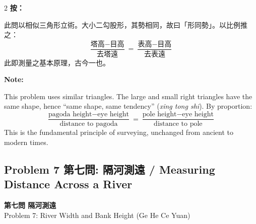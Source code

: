 \documentclass[11pt,a4paper]{article}
\newcommand{\probheader}[2]{%
  \begin{center}
  \colorbox{problembg}{\parbox{\dimexpr\linewidth-4pt}{%
    \centering\smallskip
    {\large\bfseries\color{sectioncolor}#1}\\[0.3em]
    {\normalsize\color{subsectioncolor}#2}%
    \smallskip
  }}
  \end{center}
  \vspace{0.5em}
}
\begin{document}
\begin{paracol}{2}
\switchcolumn[0]
\noindent\textbf{按：}

此問以相似三角形立術。大小二勾股形，其勢相同，故曰「形同勢」。以比例推之：
\[
\frac{\text{塔高} - \text{目高}}{\text{去塔遠}} = \frac{\text{表高} - \text{目高}}{\text{去表遠}}
\]
此即測量之基本原理，古今一也。

\switchcolumn[1]
\noindent\textbf{Note:}

This problem uses similar triangles. The large and small right triangles have the same shape, hence ``same shape, same tendency'' (\textit{xing tong shi}). By proportion:
\[
\frac{\text{pagoda height} - \text{eye height}}{\text{distance to pagoda}} = \frac{\text{pole height} - \text{eye height}}{\text{distance to pole}}
\]
This is the fundamental principle of surveying, unchanged from ancient to modern times.
\end{paracol}

\newpage

\subsection*{Problem 7 第七問: 隔河測遠 / Measuring Distance Across a River}

\probheader{第七問 隔河測遠}{Problem 7: River Width and Bank Height (Ge He Ce Yuan)}
\end{document}
